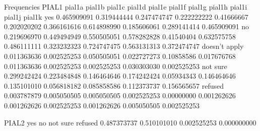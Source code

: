 Frequencies
    PIAL1
                            pial1a      pial1b      pial1c      pial1d     pial1e      pial1f      pial1g      pial1h      pial1i      pial1j      pial1k
        yes             0.465909091 0.319444444 0.247474747 0.222222222 0.41666667 0.202020202 0.366161616 0.614898990 0.185606061 0.289141414 0.465909091
        no              0.219696970 0.449494949 0.550505051 0.578282828 0.41540404 0.632575758 0.486111111 0.323232323 0.724747475 0.563131313 0.372474747
        doesn't apply   0.011363636 0.002525253 0.050505051 0.022727273 0.10858586 0.017676768 0.011363636 0.002525253 0.002525253 0.030303030 0.002525253
        not sure        0.299242424 0.223484848 0.146464646 0.174242424 0.05934343 0.146464646 0.135101010 0.056818182 0.085858586 0.112373737 0.156565657
        refused         0.003787879 0.005050505 0.005050505 0.002525253 0.00000000 0.001262626 0.001262626 0.002525253 0.001262626 0.005050505 0.002525253

    
    PIAL2
            yes         no        not sure      refused
        0.487373737 0.510101010 0.002525253 0.000000000

